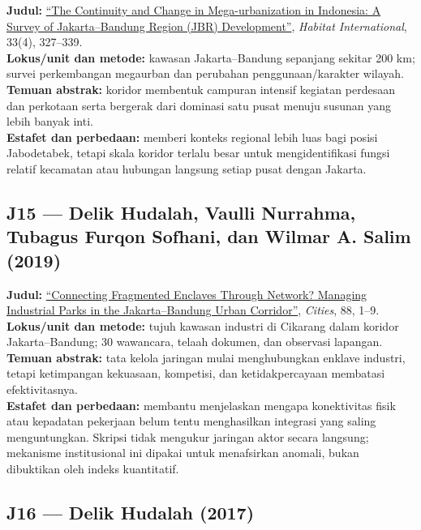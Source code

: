 \documentclass[
  indonesian,
  11pt,
  a4paper,
  oneside,
  openany]{report}
\begin{document}
\textbf{Judul:}
\href{https://doi.org/10.1016/j.habitatint.2008.08.005}{``The Continuity
and Change in Mega-urbanization in Indonesia: A Survey of
Jakarta--Bandung Region (JBR) Development''}, \emph{Habitat
International}, 33(4), 327--339.\\
\textbf{Lokus/unit dan metode:} kawasan Jakarta--Bandung sepanjang
sekitar 200 km; survei perkembangan megaurban dan perubahan
penggunaan/karakter wilayah.\\
\textbf{Temuan abstrak:} koridor membentuk campuran intensif kegiatan
perdesaan dan perkotaan serta bergerak dari dominasi satu pusat menuju
susunan yang lebih banyak inti.\\
\textbf{Estafet dan perbedaan:} memberi konteks regional lebih luas bagi
posisi Jabodetabek, tetapi skala koridor terlalu besar untuk
mengidentifikasi fungsi relatif kecamatan atau hubungan langsung setiap
pusat dengan Jakarta.

\subsection{J15 --- Delik Hudalah, Vaulli Nurrahma, Tubagus Furqon
Sofhani, dan Wilmar A. Salim
(2019)}\label{j15-delik-hudalah-vaulli-nurrahma-tubagus-furqon-sofhani-dan-wilmar-a.-salim-2019}

\textbf{Judul:}
\href{https://doi.org/10.1016/j.cities.2019.01.005}{``Connecting
Fragmented Enclaves Through Network? Managing Industrial Parks in the
Jakarta--Bandung Urban Corridor''}, \emph{Cities}, 88, 1--9.\\
\textbf{Lokus/unit dan metode:} tujuh kawasan industri di Cikarang dalam
koridor Jakarta--Bandung; 30 wawancara, telaah dokumen, dan observasi
lapangan.\\
\textbf{Temuan abstrak:} tata kelola jaringan mulai menghubungkan
enklave industri, tetapi ketimpangan kekuasaan, kompetisi, dan
ketidakpercayaan membatasi efektivitasnya.\\
\textbf{Estafet dan perbedaan:} membantu menjelaskan mengapa
konektivitas fisik atau kepadatan pekerjaan belum tentu menghasilkan
integrasi yang saling menguntungkan. Skripsi tidak mengukur jaringan
aktor secara langsung; mekanisme institusional ini dipakai untuk
menafsirkan anomali, bukan dibuktikan oleh indeks kuantitatif.

\subsection{J16 --- Delik Hudalah (2017)}\label{j16-delik-hudalah-2017}
\end{document}
